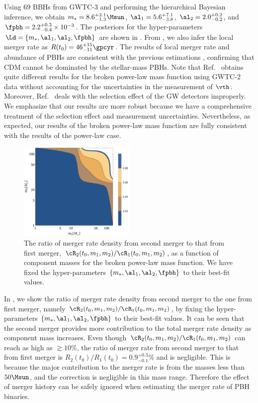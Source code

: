 \documentclass[
reprint,           %
superscriptaddress,%
amsmath,           %
amssymb,           %
aps,               %
prd,               %
notitlepage,       %
longbibliography,  %
floatfix,          %
nofootinbib,
]{revtex4-1}
\begin{document}
Using $69$ BBHs from GWTC-3 and performing the hierarchical Bayesian inference, we obtain $m_* = 8.6^{+2.1}_{-1.3} \Msun$, $\al_1 = 5.6^{+7.1}_{-3.8}$, $\al_2 = 2.0^{+0.2}_{-0.2}$, and $\fpbh = 2.2^{+0.3}_{-0.4} \times 10^{-3}$. The posteriors for the hyper-parameters $\Ld = \{m_*, \al_1, \al_2, \fpbh\}$ are shown in . From , we also infer the local merger rate as $R(t_0) = 46^{+15}_{-11} \gpcyr$. The results of local merger rate and abundance of PBHs are consistent with the previous estimations \cite{Sasaki:2016jop,Ali-Haimoud:2017rtz,Chen:2018czv,Chen:2018rzo,Chen:2019irf,Wu:2020drm,Chen:2021nxo,Chen:2022fda}, confirming that CDM cannot be dominated by the stellar-mass PBHs. Note that Ref.~\cite{Deng:2021ezy} obtains quite different results for the broken power-law mass function using GWTC-2 data without accounting for the uncertainties in the measurement of $\vth$. Moreover, Ref.~\cite{Deng:2021ezy} deals with the selection effect of the GW detectors improperly. We emphasize that our results are more robust because we have a comprehensive treatment of the selection effect and measurement uncertainties. Nevertheless, as expected, our results of the broken power-law mass function are fully consistent with the results of the power-law case.

\begin{figure}[tbp!]
	\centering
	\includegraphics[width=0.5\textwidth]{ratio-bpower.pdf}
	\caption{\label{ratio-bpower}The ratio of merger rate density from second merger to that from first merger, $\cR_2(t_0, m_1, m_2)/\cR_1(t_0, m_1, m_2)$, as a function of component masses for the broken power-law mass function. We have fixed the hyper-parameters $\{m_*, \al_1, \al_2, \fpbh\}$ to their best-fit values.}
\end{figure}

In , we show the ratio of merger rate density from second merger to the one from first merger, namely $\cR_2(t_0, m_1, m_2)/\cR_1(t_0, m_1, m_2)$, by fixing the hyper-parameters $\{m_*, \al_1, \al_2, \fpbh\}$ to their best-fit values. It can be seen that the second merger provides more contribution to the total merger rate density as component mass increases. Even though $\cR_2(t_0, m_1, m_2)/\cR_1(t_0, m_1, m_2)$ can reach as high as $\gtrsim 10\%$, the ratio of merger rate from second merger to that from first merger is $R_2(t_0)/R_1(t_0) = 0.9^{+0.3}_{-0.1}\%$ and is negligible. This is because the major contribution to the merger rate is from the masses less than $50\Msun$, and the correction is negligible in this mass range. Therefore the effect of merger history can be safely ignored when estimating the merger rate of PBH binaries.
\end{document}

